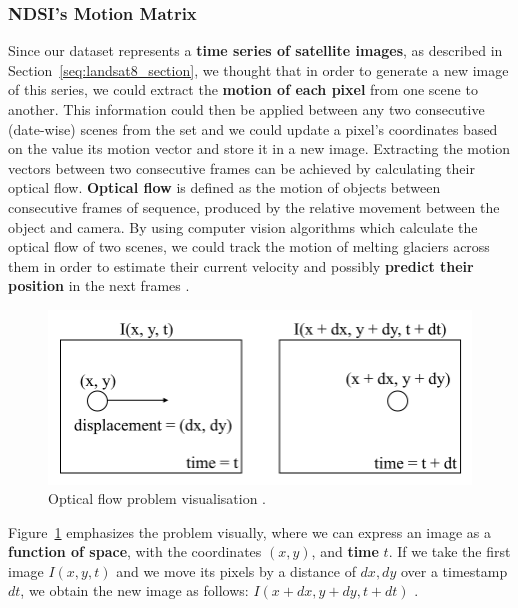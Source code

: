 \documentclass[11pt, a4paper]{report}
\begin{document}
	\subsubsection{NDSI's Motion Matrix}
	\label{seq:ndsi_motion_matrix}
	Since our dataset represents a \textbf{time series of satellite images}, as described in Section~\ref{seq:landsat8_section}, we thought that in order to generate a new image of this series, we could extract the \textbf{motion of each pixel} from one scene to another. This information could then be applied between any two consecutive (date-wise) scenes from the set and we could update a pixel's coordinates based on the value its motion vector and store it in a new image.
	Extracting the motion vectors between two consecutive frames can be achieved by calculating their optical flow. \textbf{Optical flow} is defined as the motion of objects between consecutive frames of sequence, produced by the relative movement between the object and camera. By using computer vision algorithms which calculate the optical flow of two scenes, we could track the motion of melting glaciers across them in order to estimate their current velocity and possibly \textbf{predict their position} in the next frames \cite{opticalflow}.
	\begin{figure}[h]
		\centering
		\includegraphics[scale=1.5]{../images/optical_flow_example.png}
		\caption{Optical flow problem visualisation \cite{opticalflow}.}
		\label{fig:optical_flow_example}
	\end{figure}
	
	Figure~\ref{fig:optical_flow_example} emphasizes the problem visually, where we can express an image as a \textbf{function of space}, with the coordinates \textbf{\((x, y)\)}, and \textbf{time} \textbf{\(t\)}. If we take the first image\textbf{ \(I(x, y, t)\)} and we move its pixels by a distance of \textbf{\(dx, dy\)} over a timestamp \textbf{\(dt\)}, we obtain the new image as follows: \textbf{\(I(x + dx, y + dy, t + dt)\)} \cite{orb}.
	
\end{document}

